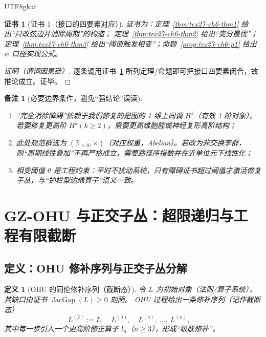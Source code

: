 \documentclass[12pt]{article}
\newtheorem{definition}{定义}[section]
\newtheorem{remark}{备注}[section]
\newtheorem{Certificate}{证书}[section]
\newcommand{\RR}{\mathbb{R}}
\newcommand{\JacGap}{\operatorname{JacGap}}
\begin{document}
\begin{CJK*}{UTF8}{gkai}
\begin{Certificate}[证书 1（接口的四要素对应）]
\label{cert:tex27-ch6-c1}
证书为：定理~\ref{thm:tex27-ch6-thm1} 给出“只改弦边并消除周期”的构造；
定理~\ref{thm:tex27-ch6-thm2} 给出“变分最优”；定理~\ref{thm:tex27-ch6-thm3} 给出“阈值触发相变”；命题~\ref{prop:tex27-ch6-p1} 给出 $w$ 口径实现公式。
\end{Certificate}

\begin{proof}[证明（谓词因果链）]
逐条调用证书~\ref{cert:tex27-ch6-c1} 所列定理/命题即可把接口四要素闭合，故推论成立。证毕。
\end{proof}

\begin{remark}[必要边界条件，避免“强结论”误读]
\begin{enumerate}
  \item “完全消除障碍”依赖于我们修复的是图的 1 维上同调 $H^1$（有效 1 阶对象）。若要修复更高阶 $H^k(k\ge 2)$，需要更高维胞腔或神经复形高阶结构；
  \item 此处规范群选为 $(\RR_{>0},\times)$（对应权重，Abelian）。若改为非交换李群，则“周期线性叠加”不再严格成立，需要路径序指数并在近单位元下线性化；
  \item 相变阈值 $\theta$ 是工程约束：平时不扰动系统，只有障碍证书超过阈值才激活修复子丛，与“护栏型边缘算子”语义一致。
\end{enumerate}
\end{remark}

\clearpage

\section{GZ-OHU 与正交子丛：超限递归与工程有限截断}
\label{sec:tex27-ch7-ohu-orthogonal}

\subsection{定义：OHU 修补序列与正交子丛分解}
\label{subsec:tex27-ch7-defs}

\begin{definition}[OHU 的同伦修补序列（截断态）]
\label{def:tex27-ch7-d1}
令 $L$ 为初始对象（法则/算子系统），其缺口由证书 $\JacGap(L)\ge 0$ 刻画。
OHU 过程给出一条修补序列（记作截断态）
\[
  L^{(2)}:=L,\quad L^{(3)},\quad L^{(4)},\ \dots,\ L^{(n)},\ \dots
\]
其中每一步引入一个更高阶修正算子 $l_n$（$n\ge 3$），形成“级联修补”。
\end{definition}


\end{CJK*}
\end{document}
